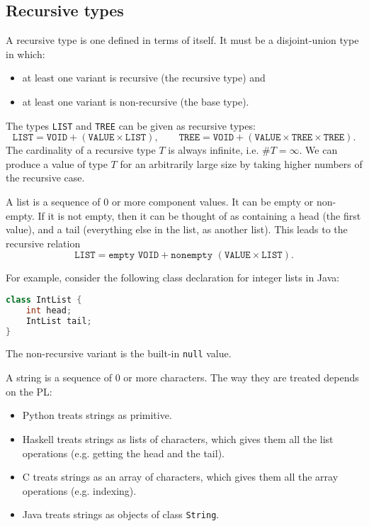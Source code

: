 \documentclass[a4paper, openany]{memoir}
\begin{document}
\subsection{Recursive types}
A recursive type is one defined in terms of itself. It must be a disjoint-union type in which:
\begin{itemize}
    \item at least one variant is recursive (the recursive type) and
    \item at least one variant is non-recursive (the base type).
\end{itemize}
The types \texttt{LIST} and \texttt{TREE} can be given as recursive types:
\[\texttt{LIST} = \texttt{VOID} + (\texttt{VALUE} \times \texttt{LIST}), \qquad \texttt{TREE} = \texttt{VOID} + (\texttt{VALUE} \times \texttt{TREE} \times \texttt{TREE}).\]
The cardinality of a recursive type $T$ is always infinite, i.e. $\# T = \infty$. We can produce a value of type $T$ for an arbitrarily large size by taking higher numbers of the recursive case.

A list is a sequence of 0 or more component values. It can be empty or non-empty. If it is not empty, then it can be thought of as containing a head (the first value), and a tail (everything else in the list, as another list). This leads to the recursive relation
\[\texttt{LIST} = \texttt{empty VOID} + \texttt{nonempty } (\texttt{VALUE} \times \texttt{LIST}).\]

For example, consider the following class declaration for integer lists in Java:
\begin{lstlisting}[language=java]
class IntList {
    int head;
    IntList tail;
}
\end{lstlisting}
The non-recursive variant is the built-in \texttt{null} value.

A string is a sequence of 0 or more characters. The way they are treated depends on the PL:
\begin{itemize}
    \item Python treats strings as primitive.
    \item Haskell treats strings as lists of characters, which gives them all the list operations (e.g. getting the head and the tail).
    \item C treats strings as an array of characters, which gives them all the array operations (e.g. indexing).
    \item Java treats strings as objects of class \texttt{String}.
\end{itemize}
\end{document}
